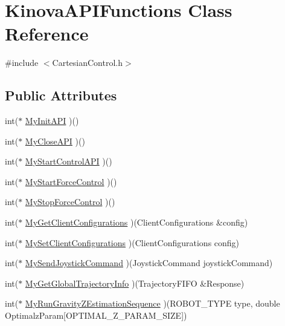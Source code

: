 \hypertarget{classKinovaAPIFunctions}{}\section{Kinova\+A\+P\+I\+Functions Class Reference}
\label{classKinovaAPIFunctions}


{\ttfamily \#include $<$Cartesian\+Control.\+h$>$}

\subsection*{Public Attributes}
\begin{DoxyCompactItemize}
\item 
int($\ast$ \hyperlink{classKinovaAPIFunctions_aed994a06c982ab33373f9fd675f8c47a}{My\+Init\+A\+PI} )()
\item 
int($\ast$ \hyperlink{classKinovaAPIFunctions_a769e4a4b1ad66aac175818db5d466ab1}{My\+Close\+A\+PI} )()
\item 
int($\ast$ \hyperlink{classKinovaAPIFunctions_a0ed40fabec0007d019c516ce460cf646}{My\+Start\+Control\+A\+PI} )()
\item 
int($\ast$ \hyperlink{classKinovaAPIFunctions_aedcd71f51df6f2983a1b25b46c6bf14c}{My\+Start\+Force\+Control} )()
\item 
int($\ast$ \hyperlink{classKinovaAPIFunctions_a893c0dc6f8834ddd3a97ee8ea5c6d152}{My\+Stop\+Force\+Control} )()
\item 
int($\ast$ \hyperlink{classKinovaAPIFunctions_a6963b06d9d1a59c04465bda48ff2a5ab}{My\+Get\+Client\+Configurations} )(Client\+Configurations \&config)
\item 
int($\ast$ \hyperlink{classKinovaAPIFunctions_a17c7058669dac3a1e8981203c53dc569}{My\+Set\+Client\+Configurations} )(Client\+Configurations config)
\item 
int($\ast$ \hyperlink{classKinovaAPIFunctions_a83ca7834bb9b9eb003b1925603f1778c}{My\+Send\+Joystick\+Command} )(Joystick\+Command joystick\+Command)
\item 
int($\ast$ \hyperlink{classKinovaAPIFunctions_a715a78b82f9e65326f9b66f01287fe2a}{My\+Get\+Global\+Trajectory\+Info} )(Trajectory\+F\+I\+FO \&Response)
\item 
int($\ast$ \hyperlink{classKinovaAPIFunctions_a93a9e5fd28e1a49350f02494cb7bd0f7}{My\+Run\+Gravity\+Z\+Estimation\+Sequence} )(R\+O\+B\+O\+T\+\_\+\+T\+Y\+PE type, double Optimalz\+Param\mbox{[}O\+P\+T\+I\+M\+A\+L\+\_\+\+Z\+\_\+\+P\+A\+R\+A\+M\+\_\+\+S\+I\+ZE\mbox{]})

\end{DoxyCompactItemize}
